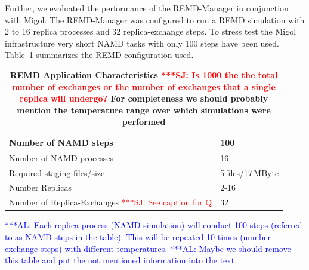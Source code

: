 \documentclass[times, 10pt, twocolumn]{article}
\newcommand{\alnote}[1]{ {\textcolor{blue} { ***AL: #1 }}}
\newcommand{\jhanote}[1]{ {\textcolor{red} { ***SJ: #1 }}}
\newcommand{\alnote}[1]{}
\newcommand{\jhanote}[1]{}
\newcommand{\up}{\vspace*{-1em}}
\begin{document}
Further, we evaluated the performance of the REMD-Manager in
conjunction with Migol.  The REMD-Manager was configured to run a REMD
simulation with 2 to 16 replica processes and 32 replica-exchange
steps. To stress test the Migol infrastructure very short NAMD tasks
with only 100 steps have been used. Table~\ref{tab:app_stats}
summarizes the REMD configuration used.
\begin{table}        
    \centering
	\begin{tabular}{|p{5cm}|l|}
          \hline
          Number of NAMD steps &100\\ \hline 
          Number of NAMD processes &16\\ \hline 
          Required staging files/size &5\,files/17\,MByte\\ \hline
          Number Replicas &2-16 \\ \hline
          Number of Replica-Exchanges \jhanote{See caption for Q} &32\\ \hline
	\end{tabular}
	\caption{\small \bf REMD Application Characteristics\label{tab:app_stats}
          \jhanote{Is 1000 the the total number of exchanges or the
            number of exchanges that a single replica will undergo?}
          For completeness we should probably mention the temperature
          range over which simulations were performed}
          \alnote{Each replica process (NAMD simulation) will conduct 
          100 steps (referred to as NAMD steps in the table). This 
          will be repeated 10 times (number exchange steps) with 
          different temperatures.}         
          \alnote{Maybe we should remove this table and put the not mentioned information 
          into the text}
          \up\up
\end{table}   
\end{document}
